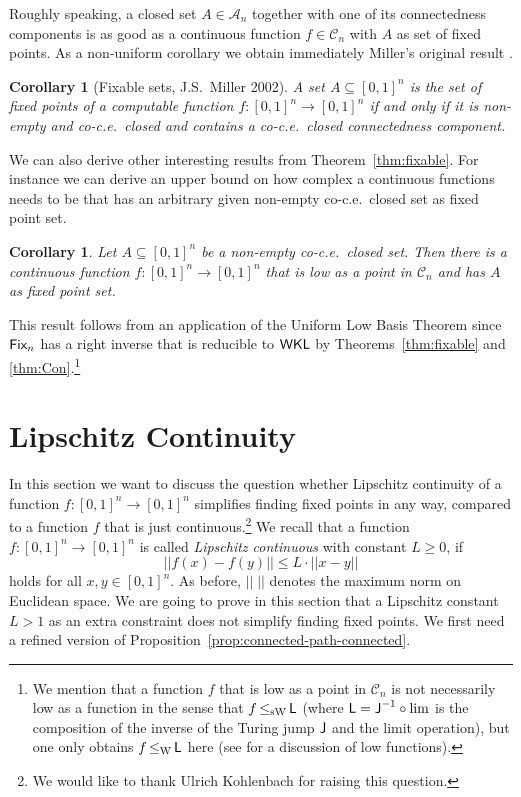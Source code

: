 \documentclass[a4paper]{amsart}
\def\AA{{\mathcal A}}
\def\CC{{\mathcal C}}
\def\In{\subseteq}
\def\WKL{\text{\rm\sffamily WKL}}
\def\L{\text{\rm\sffamily L}}
\def\Fix{\text{\rm\sffamily Fix}}
\def\J{\text{\rm\sffamily J}}
\def\leqW{\mathop{\leq_{\mathrm{W}}}}
\def\leqSW{\mathop{\leq_{\mathrm{sW}}}}
\newtheorem{corollary}[theorem]{Corollary}
\theoremstyle{definition}
\begin{document}
Roughly speaking, a closed set $A\in\AA_n$ together with one of its connectedness components is as
good as a continuous function $f\in\CC_n$ with $A$ as set of fixed points.
As a non-uniform corollary we obtain immediately Miller's original result \cite[Theorem~2.6.1]{Mil02a}.

\begin{corollary}[Fixable sets, J.S.\ Miller 2002]
A set $A\In[0,1]^n$ is the set of fixed points of a computable function $f:[0,1]^n\to[0,1]^n$
if and only if it is non-empty and co-c.e.\ closed and contains a co-c.e.\ closed connectedness component.
\end{corollary}

We can also derive other interesting results from Theorem~\ref{thm:fixable}.
For instance we can derive an upper bound on how complex a continuous functions needs to be that 
has an arbitrary given non-empty co-c.e.\ closed set as fixed point set.

\begin{corollary}
Let $A\In[0,1]^n$ be a non-empty co-c.e.\ closed set. Then there is a
continuous function $f:[0,1]^n\to[0,1]^n$ that is low as a point in $\CC_n$ and has $A$ as fixed point set.
\end{corollary}

This result follows from an application of the Uniform Low Basis Theorem \cite[Theorem~8.3]{BBP12}
since $\Fix_n$ has a right inverse that is reducible to $\WKL$ by Theorems~\ref{thm:fixable}
and \ref{thm:Con}.\footnote{We mention that a function $f$ that is low as a point in $\CC_n$
is not necessarily low as a function in the sense that $f\leqSW\L$ (where $\L=\J^{-1}\circ\lim$ is the composition of
the inverse of the Turing jump $\J$ and the limit operation), but one only obtains $f\leqW\L$ here
(see \cite{BBP12,BGM12} for a discussion of low functions).}


\section{Lipschitz Continuity}
\label{sec:Lipschitz}

In this section we want to discuss the question whether Lipschitz continuity of a function $f:[0,1]^n\to[0,1]^n$
simplifies finding fixed points in any way, compared to a function $f$ that is just continuous.\footnote{We would like to thank Ulrich Kohlenbach for raising this question.}
We recall that a function $f:[0,1]^n\to[0,1]^n$ is called {\em Lipschitz continuous} with constant $L\geq0$, if
\[||f(x)-f(y)||\leq L\cdot||x-y||\]
holds for all $x,y\in[0,1]^n$. As before, $||\;||$ denotes the maximum norm on Euclidean space.
We are going to prove in this section that a Lipschitz constant $L>1$ as an extra constraint does not simplify finding fixed points.
We first need a refined version of Proposition~\ref{prop:connected-path-connected}.
\end{document}

